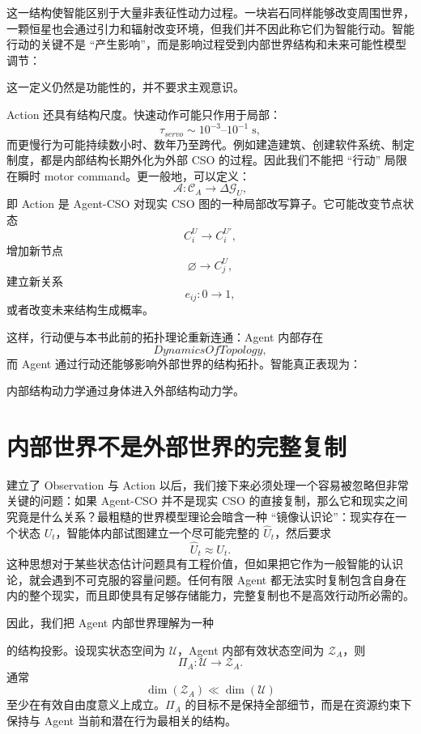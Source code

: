 这一结构使智能区别于大量非表征性动力过程。一块岩石同样能够改变周围世界，一颗恒星也会通过引力和辐射改变环境，但我们并不因此称它们为智能行动。智能行动的关键不是 ``产生影响''，而是影响过程受到内部世界结构和未来可能性模型调节：
\begin{statementbox}
\centering
{}
\end{statementbox}
这一定义仍然是功能性的，并不要求主观意识。

Action 还具有结构尺度。快速动作可能只作用于局部：
\[
\tau_{servo}
\sim
10^{-3}\text{--}10^{-1}\;\mathrm{s},
\]
而更慢行为可能持续数小时、数年乃至跨代。例如建造建筑、创建软件系统、制定制度，都是内部结构长期外化为外部 CSO 的过程。因此我们不能把 ``行动'' 局限在瞬时 motor command。更一般地，可以定义：
\[
\mathcal A:
\mathcal C_A
\rightarrow
\Delta \mathcal G_U,
\]
即 Action 是 Agent-CSO 对现实 CSO 图的一种局部改写算子。它可能改变节点状态
\[
C_i^U\rightarrow C_i^{U'},
\]
增加新节点
\[
\varnothing\rightarrow C_j^U,
\]
建立新关系
\[
e_{ij}:0\rightarrow1,
\]
或者改变未来结构生成概率。

这样，行动便与本书此前的拓扑理论重新连通：Agent 内部存在
\[
DynamicsOfTopology,
\]
而 Agent 通过行动还能够影响外部世界的结构拓扑。智能真正表现为：
\begin{statementbox}
内部结构动力学通过身体进入外部结构动力学。
\end{statementbox}


\section{内部世界不是外部世界的完整复制}

建立了 Observation 与 Action 以后，我们接下来必须处理一个容易被忽略但非常关键的问题：如果 Agent-CSO 并不是现实 CSO 的直接复制，那么它和现实之间究竟是什么关系？最粗糙的世界模型理论会暗含一种 ``镜像认识论''：现实存在一个状态 $U_t$，智能体内部试图建立一个尽可能完整的 $\hat U_t$，然后要求
\[
\hat U_t
\approx
U_t.
\]
这种思想对于某些状态估计问题具有工程价值，但如果把它作为一般智能的认识论，就会遇到不可克服的容量问题。任何有限 Agent 都无法实时复制包含自身在内的整个现实，而且即使具有足够存储能力，完整复制也不是高效行动所必需的。

因此，我们把 Agent 内部世界理解为一种
\begin{statementbox}
\centering
{}
\end{statementbox}
的结构投影。设现实状态空间为 $\mathcal U$，Agent 内部有效状态空间为 $\mathcal Z_A$，则
\[
\Pi_A:\mathcal U\rightarrow\mathcal Z_A.
\]
通常
\[
\dim(\mathcal Z_A)
\ll
\dim(\mathcal U)
\]
至少在有效自由度意义上成立。$\Pi_A$ 的目标不是保持全部细节，而是在资源约束下保持与 Agent 当前和潜在行为最相关的结构。

